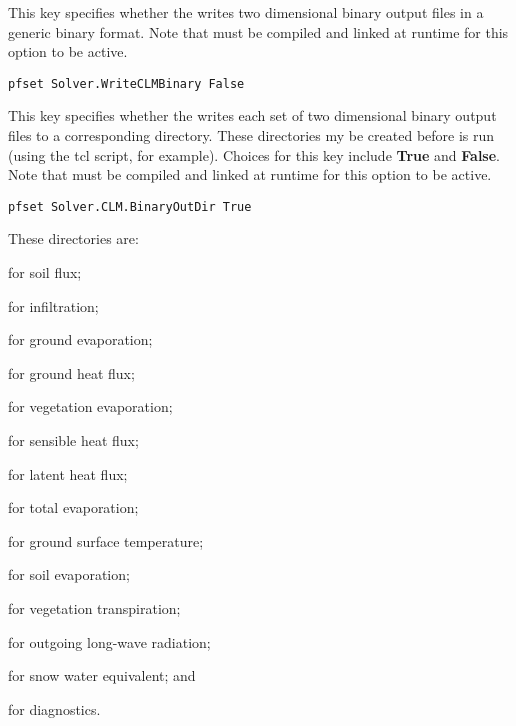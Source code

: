 {This key specifies whether the  writes two dimensional binary output files in a generic binary format.  
 Note that  must be compiled and linked at runtime for this option to be active.
}
\begin{display}\begin{verbatim}
pfset Solver.WriteCLMBinary False
\end{verbatim}\end{display}

{This key specifies whether the  writes each set of two dimensional binary output files to a corresponding directory.  
These directories my be created before \parflow{} is run (using the tcl script, for example).  Choices for this key include {\bf True} and {\bf False}. Note that  must be compiled and linked at runtime for this option to be active.
}
\begin{display}\begin{verbatim}
pfset Solver.CLM.BinaryOutDir True
\end{verbatim}\end{display}
These directories are: 
\begin{description}
\item {} for soil flux;
\item {} for infiltration;
\item {} for ground evaporation;
\item {} for ground heat flux;
\item {} for vegetation evaporation;
\item {} for sensible heat flux;
\item {} for latent heat flux; 
\item {} for total evaporation; 
\item {} for ground surface temperature; 
\item {} for soil evaporation; 
\item {} for vegetation transpiration; 
\item {} for outgoing long-wave radiation;
\item {} for snow water equivalent; and
\item {} for diagnostics. 
\end{description}


